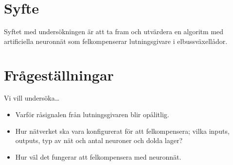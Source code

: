 \section{Syfte}
Syftet med undersökningen är att ta fram och utvärdera en algoritm med
artificiella neuronnät som felkompenserar lutningsgivare i elbussväxellådor.


\section{Frågeställningar}
Vi vill undersöka\ldots
\begin{itemize}
	\item Varför råsignalen från lutningsgivaren blir opålitlig.
	\item Hur nätverket ska vara konfigurerat för att felkompensera; vilka inputs,
		outputs, typ av nät och antal neuroner och dolda lager?
	\item Hur väl det fungerar att felkompensera med neuronnät.
\end{itemize}
